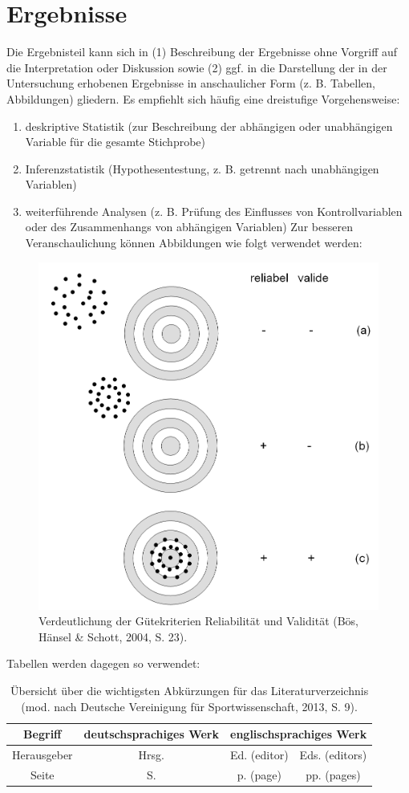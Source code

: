 \chapter{Ergebnisse}
Die Ergebnisteil kann sich in (1) Beschreibung der Ergebnisse ohne Vorgriff auf die Interpretation oder Diskussion sowie (2) ggf. in die Darstellung der in der Untersuchung erhobenen Ergebnisse in anschaulicher Form (z. B. Tabellen, Abbildungen) gliedern. Es empfiehlt sich häufig eine dreistufige Vorgehensweise:
\begin{enumerate}
	\item deskriptive Statistik (zur Beschreibung der abhängigen oder unabhängigen Variable für die gesamte Stichprobe)
	\item Inferenzstatistik (Hypothesentestung, z. B. getrennt nach unabhängigen Variablen)
	\item weiterführende Analysen (z. B. Prüfung des Einflusses von Kontrollvariablen oder des Zusammenhangs von abhängigen Variablen)
	Zur besseren Veranschaulichung können Abbildungen wie folgt verwendet werden:	
\end{enumerate}
\begin{figure}[h]
	\centering
	\includegraphics[width=0.7\linewidth]{images/guetekriterien-reliabilitaet-und-variabilitaet}
	\caption{Verdeutlichung der Gütekriterien Reliabilität und Validität (Bös, Hänsel \& Schott, 2004, S. 23).}
	\label{fig:guetekriterien-reliabilitaet-und-variabilitaet}
\end{figure}
Tabellen werden dagegen so verwendet:
\begin{table}
	\centering
	\caption{Übersicht über die wichtigsten Abkürzungen für das Literaturverzeichnis (mod. nach Deutsche Vereinigung für Sportwissenschaft, 2013, S. 9).}
	\label{tab:uebersicht-wichtigste-abkuerzungen}
	\begin{tabular}{|c|c|c|c|}
		\hline
		Begriff & deutschsprachiges Werk & \multicolumn{2}{c|}{englischsprachiges Werk}\\
		\hline
		Herausgeber & Hrsg. & Ed. (editor) & Eds. (editors) \\
		\hline
		Seite & S. & p. (page) & pp. (pages) \\
		\hline
	\end{tabular}
\end{table}
